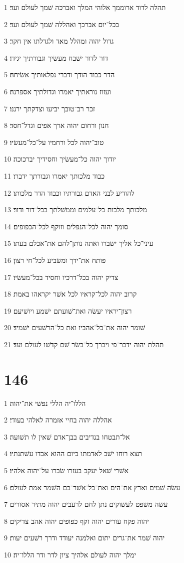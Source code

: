 \par 1 תהלה לדוד ארוממך אלוהי המלך ואברכה שׁמך לעולם ועד׃
\par 2 בכל־יום אברכך ואהללה שׁמך לעולם ועד׃
\par 3 גדול יהוה ומהלל מאד ולגדלתו אין חקר׃
\par 4 דור לדור ישׁבח מעשׂיך וגבורתיך יגידו׃
\par 5 הדר כבוד הודך ודברי נפלאותיך אשׂיחה׃
\par 6 ועזוז נוראתיך יאמרו וגדולתיך אספרנה׃
\par 7 זכר רב־טובך יביעו וצדקתך ירננו׃
\par 8 חנון ורחום יהוה ארך אפים וגדל־חסד׃
\par 9 טוב־יהוה לכל ורחמיו על־כל־מעשׂיו׃
\par 10 יודוך יהוה כל־מעשׂיך וחסידיך יברכוכה׃
\par 11 כבוד מלכותך יאמרו וגבורתך ידברו׃
\par 12 להודיע לבני האדם גבורתיו וכבוד הדר מלכותו׃
\par 13 מלכותך מלכות כל־עלמים וממשׁלתך בכל־דור ודור׃
\par 14 סומך יהוה לכל־הנפלים וזוקף לכל־הכפופים׃
\par 15 עיני־כל אליך ישׂברו ואתה נותן־להם את־אכלם בעתו׃
\par 16 פותח את־ידך ומשׂביע לכל־חי רצון׃
\par 17 צדיק יהוה בכל־דרכיו וחסיד בכל־מעשׂיו׃
\par 18 קרוב יהוה לכל־קראיו לכל אשׁר יקראהו באמת׃
\par 19 רצון־יראיו יעשׂה ואת־שׁועתם ישׁמע ויושׁיעם׃
\par 20 שׁומר יהוה את־כל־אהביו ואת כל־הרשׁעים ישׁמיד׃
\par 21 תהלת יהוה ידבר־פי ויברך כל־בשׂר שׁם קדשׁו לעולם ועד׃

\chapter{146}

\par 1 הללו־יה הללי נפשׁי את־יהוה׃
\par 2 אהללה יהוה בחיי אזמרה לאלהי בעודי׃
\par 3 אל־תבטחו בנדיבים בבן־אדם שׁאין לו תשׁועה׃
\par 4 תצא רוחו ישׁב לאדמתו ביום ההוא אבדו עשׁתנתיו׃
\par 5 אשׁרי שׁאל יעקב בעזרו שׂברו על־יהוה אלהיו׃
\par 6 עשׂה שׁמים וארץ את־הים ואת־כל־אשׁר־בם השׁמר אמת לעולם׃
\par 7 עשׂה משׁפט לעשׁוקים נתן לחם לרעבים יהוה מתיר אסורים׃
\par 8 יהוה פקח עורים יהוה זקף כפופים יהוה אהב צדיקים׃
\par 9 יהוה שׁמר את־גרים יתום ואלמנה יעודד ודרך רשׁעים יעות׃
\par 10 ימלך יהוה לעולם אלהיך ציון לדר ודר הללו־יה׃

